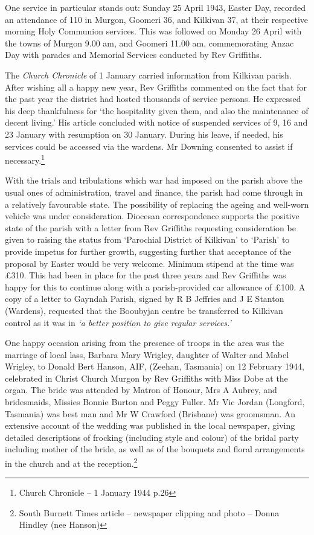 One service in particular stands out: Sunday 25 April 1943, Easter Day, recorded an attendance of 110 in Murgon, Goomeri 36, and Kilkivan 37, at their respective morning Holy Communion services. This was followed on Monday 26 April with the towns of Murgon 9.00 am, and Goomeri 11.00 am, commemorating Anzac Day with parades and Memorial Services conducted by Rev Griffiths.

The \emph{Church Chronicle} of 1 January carried information from Kilkivan parish. After wishing all a happy new year, Rev Griffiths commented on the fact that for the past year the district had hosted thousands of service persons. He expressed his deep thankfulness for `the hospitality given them, and also the maintenance of decent living.' His article concluded with notice of suspended services of 9, 16 and 23 January with resumption on 30 January. During his leave, if needed, his services could be accessed via the wardens. Mr Downing consented to assist if necessary.\footnote{Church Chronicle -- 1 January 1944 p.26}

With the trials and tribulations which war had imposed on the parish above the usual ones of administration, travel and finance, the parish had come through in a relatively favourable state. The possibility of replacing the ageing and well-worn vehicle was under consideration. Diocesan correspondence supports the positive state of the parish with a letter from Rev Griffiths requesting consideration be given to raising the status from `Parochial District of Kilkivan' to `Parish' to provide impetus for further growth, suggesting further that acceptance of the proposal by Easter would be very welcome. Minimum stipend at the time was £310. This had been in place for the past three years and Rev Griffiths was happy for this to continue along with a parish-provided car allowance of £100. A copy of a letter to Gayndah Parish, signed by R B Jeffries and J E Stanton (Wardens), requested that the Booubyjan centre be transferred to Kilkivan control as it was in \emph{`a better position to give regular services.'}

One happy occasion arising from the presence of troops in the area was the marriage of local lass, Barbara Mary Wrigley, daughter of Walter and Mabel Wrigley, to Donald Bert Hanson, AIF, (Zeehan, Tasmania) on 12 February 1944, celebrated in Christ Church Murgon by Rev Griffiths with Miss Dobe at the organ. The bride was attended by Matron of Honour, Mrs A Aubrey, and bridesmaids, Missies Bonnie Burton and Peggy Fuller. Mr Vic Jordan (Longford, Tasmania) was best man and Mr W Crawford (Brisbane) was groomsman. An extensive account of the wedding was published in the local newspaper, giving detailed descriptions of frocking (including style and colour) of the bridal party including mother of the bride, as well as of the bouquets and floral arrangements in the church and at the reception.\footnote{South Burnett Times article -- newspaper clipping and photo -- Donna Hindley (nee Hanson)}

